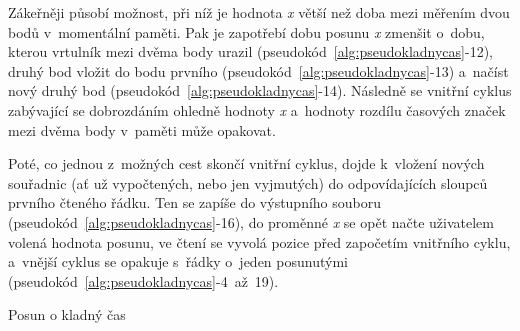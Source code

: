 Zákeřněji působí možnost, při níž je hodnota \textit{x} větší než doba mezi měřením dvou
bodů v~momentální paměti. Pak je zapotřebí dobu posunu \textit{x} zmenšit o~dobu, kterou
vrtulník mezi dvěma body urazil (pseudokód~\ref{alg:pseudokladnycas}-12),
druhý bod vložit do bodu prvního (pseudokód~\ref{alg:pseudokladnycas}-13) a~načíst
nový druhý bod (pseudokód~\ref{alg:pseudokladnycas}-14). Následně
se vnitřní cyklus zabývající se dobrozdáním ohledně hodnoty \textit{x} a~hodnoty
rozdílu časových značek mezi dvěma body v~paměti může opakovat. 

Poté, co jednou z~možných cest skončí vnitřní cyklus, dojde k~vložení nových souřadnic
(ať už vypočtených, nebo jen vyjmutých) do odpovídajících sloupců první\-ho čteného řádku.
Ten se zapíše do výstupního souboru (pseudokód~\ref{alg:pseudokladnycas}-16),
do proměnné \textit{x} se opět načte uživatelem volená
hodnota posunu, ve čtení se vyvolá pozice před započetím vnitřního cyklu, a~vnější cyklus se
opakuje s~řádky o~jeden posunutými (pseudokód~\ref{alg:pseudokladnycas}-4~až~19). 

\begin{algorithm}
    \caption{Posun o kladný čas}
    \label{alg:pseudokladnycas}
    \begin{algorithmic}[1]
\end{algorithmic}
\end{algorithm}

\begin{algorithm}                     
\begin{algorithmic} [1]
    \ENDWHILE
    \ENDWHILE
    \end{algorithmic}
\end{algorithm}

